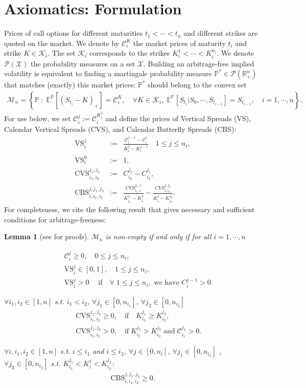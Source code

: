 \documentclass{amsart}%
\def\Cc{{\cal C}}
\def\Pc{{\cal P}}
\def\Xc{{\cal X}}
\def\no{\noindent}
\newtheorem{lem}[thm]{Lemma}
\theoremstyle{definition}
\theoremstyle{remark}
\newcommand{\PP}{\mathbb{P}}
\newcommand{\beaa}{\begin{eqnarray*}}
\newcommand{\eeaa}{\end{eqnarray*}}
\newcommand{\EE}{{\mathbb E}}
\newcommand{\RR}{{\mathbb R}}
\newcommand{\cal}{\mathcal}
\begin{document}
\section{Axiomatics: Formulation}\label{sect:intro}

\no Prices of call options for different maturities $t_1 < \cdots < t_n$ and different strikes are quoted on the market. We denote by
$\Cc_i^K$ the market prices of maturity $t_i$ and strike $K \in {\cal K}_i$. The set ${\cal K}_i$ corresponds to the strikes  $K_i^1 < \cdots < K_i^{n_i}$. We denote $\Pc(\Xc)$ the probability measures on a set $\Xc$. Building an arbitrage-free implied volatility is equivalent to finding a martingale probability measure $\PP^*\in\Pc(\RR_+^n)$ that matches (exactly) this  market prices: $\PP^*$ should belong to the convex set
\beaa
{\cal M}_n=\left\{ \PP \; : \;  \EE^\PP[(S_{t_i}-K)_+]=\Cc_i^K, \quad \forall K \in {\cal K}_i, \; \EE^\PP[S_{t_i}|S_0,\cdots, S_{t_{i-1}}]=S_{t_{i-1}}, \quad i=1, \cdots ,n \right\}.
\eeaa
\no For use below, we set ${\cal C}_i^j:=\Cc_i^{K_i^j}$ and define the prices of Vertical Spreads (VS), Calendar Vertical Spreads (CVS), and Calendar Butterfly Spreads (CBS):
\beaa
\mathrm{VS}_i^j &:=& \frac{ {\cal C}_i^{j-1}-{\cal C}_i^{j} }{K_i^j -K^{j-1}_i } \quad 1 \leq j \leq n_i, \\
\mathrm{VS}_i^0&:=&1, \\
\mathrm{CVS}_ {i_1,i_2}^{j_1,j_2}&:=& C_{i_2}^{j_2}- C_{i_1}^{j_1}, \\
\mathrm{CBS}_ {i,i_1,i_2}^{j,j_1,j_2}&:=&\frac{CVS_ {i_1,i}^{j_1,j}
}{K_{i_1}^{j_1} -K_{i}^j }-\frac{ CVS_ {i,i_2}^{j,j_2}
}{K_{i}^j -K_{i_2}^{j_2}  }.
\eeaa
\no For completeness, we cite the following result that gives necessary and sufficient conditions for  arbitrage-freeness:
\begin{lem}[see \cite{carr2005note,cousot2007conditions} for proofs]\label{lemma:Mn-non-empty} ${\cal M}_n$ is non-empty if and only if for all $i=1,\cdots,n$

\no {\bf (1)}
\beaa
&&{\cal C}_i^j \geq 0,\quad 0 \leq j \leq n_i, \\
&&\mathrm{VS}_i^j \in [0,1],\quad  1 \leq j \leq n_i, \\
&&\mathrm{VS}_i^j>0 \quad\; \mathrm{if} \quad \forall \; 1 \leq j \leq n_i, \mbox{ we have } C^{j-1}_i>0.
\eeaa

\no {\bf (2)}  $\forall i_1,i_2 \in [1,n]$ s.t. $i_1<i_2$, $\forall j_1 \in [0,n_{i_1}]$, $\forall j_2 \in [0,n_{i_2}]$
\beaa
&&\mathrm{CVS}_{i_1,i_2}^{j_1,j_2} \geq 0, \quad \mathrm{if} \quad K_{i_1}^{j_1} \geq K_{i_2}^{j_2}, \\
&&\mathrm{CVS}_{i_1,i_2}^{j_1,j_2} > 0, \quad \mathrm{if} \; K_{i_1}^{j_1} > K_{i_2}^{j_2}  \; \mathrm{and} \; {\cal C}^{j_1}_{i_1}>0.
\eeaa

\no {\bf (3)} $\forall i,i_1,i_2 \in [1,n]$ s.t. $i \leq i_1$ and $i \leq i_2$, $\forall j \in [0,n_i]$, $\forall j_1 \in [0,n_{i_1}]$ , $\forall j_2 \in [0,n_{i_2}]$ s.t.  $
K_{i_1}^{j_1}<K_i^j < K_{i_2}^{j_2}$:
\beaa \mathrm{CBS}^{j,j_1,j_2}_{i,i_1,i_2} \geq 0. \eeaa

\end{lem}
\end{document}
